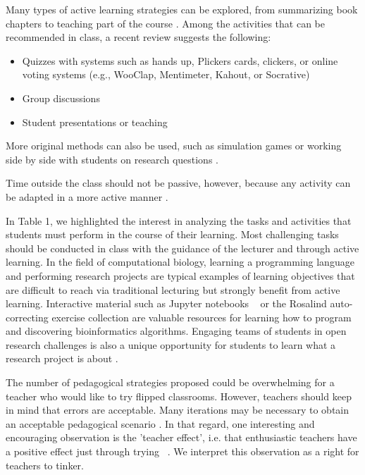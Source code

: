 \documentclass[10pt,letterpaper]{article}
\begin{document}
Many types of active learning strategies can be explored, from summarizing book chapters to teaching part of the course \cite{fiorella_eight_2016}. Among the activities that can be recommended in class, a recent review \cite{delozier_flipped_2017} suggests the following:

\begin{itemize}

\item Quizzes with systems such as hands up, Plickers cards, clickers, 
or online voting systems (e.g., WooClap, Mentimeter, Kahout, or Socrative)

\item Group discussions

\item Student presentations or teaching

\end{itemize}


More original methods can also be used, such as simulation games \cite{taly2019molecular} or working side by side 
with students on research questions \cite{mazzanti2017can}. 

Time outside the class should not be passive, 
however, because any activity can be adapted in a more active manner \cite{chi_icap_2014}.

In Table 1, we highlighted the interest in analyzing the tasks and activities that students must perform in the course of their learning. 
Most challenging tasks should be conducted in class with the guidance of the lecturer and through active learning. 
In the field of computational biology, learning a programming language and performing research projects are typical examples 
of learning objectives that are difficult to reach via traditional lecturing but strongly benefit from active learning. 
Interactive material such as Jupyter notebooks ~\cite{davies_using_2020,rule_ten_2019} or the Rosalind auto-correcting
exercise collection \cite{compeau_bioinformatics_2018} are valuable resources for learning how to program
and discovering bioinformatics algorithms.
Engaging teams of students in open research challenges is also a unique opportunity for students to learn what a research project is about \cite{abdollahi2018meet}.

The number of pedagogical strategies proposed could be overwhelming for a teacher who would like to try flipped classrooms. 
However, teachers should keep in mind that errors are acceptable. 
Many iterations may be necessary to obtain an acceptable pedagogical scenario \cite{compeau_establishing_2019}. 
In that regard, one interesting and encouraging observation is the 'teacher effect', 
i.e. that enthusiastic teachers have a positive effect just through trying ~\cite{hattie_visible_2008}. 
We interpret this observation as a right for teachers to tinker.
\end{document}
